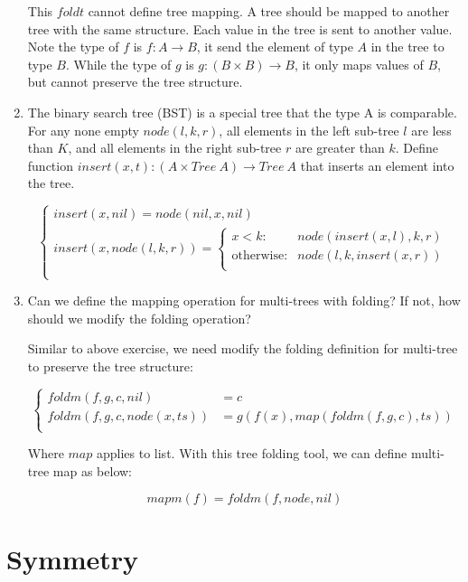 \documentclass[UTF8]{article}
\begin{document}
\begin{enumerate}
This $foldt$ cannot define tree mapping. A tree should be mapped to another tree with the same structure. Each value in the tree is sent to another value. Note the type of $f$ is $f : A \to B$, it send the element of type $A$ in the tree to type $B$. While the type of $g$ is $g : (B \times B) \to B$, it only maps values of $B$, but cannot preserve the tree structure.

\item {The binary search tree (BST) is a special tree that the type A is comparable. For any none empty $node(l, k, r)$, all elements in the left sub-tree $l$ are less than $K$, and all elements in the right sub-tree $r$ are greater than $k$. Define function $insert(x, t) : (A \times Tree\ A) \to Tree\ A$ that inserts an element into the tree.}

\[ \begin{cases}
insert(x, nil) = node(nil, x, nil) \\
insert(x, node(l, k, r)) = \begin{cases}
  x < k: & node(insert(x, l), k, r) \\
  \text{otherwise}: & node(l, k, insert(x, r)) \\
\end{cases} \\
\end{cases}\]

\item {Can we define the mapping operation for multi-trees with folding? If not, how should we modify the folding operation?}

Similar to above exercise, we need modify the folding definition for multi-tree to preserve the tree structure:

\[
\begin{cases}
foldm(f, g, c, nil) & = c \\
foldm(f, g, c, node(x, ts)) & = g(f(x), map(foldm(f, g, c), ts)) \\
\end{cases}
\]

Where $map$ applies to list. With this tree folding tool, we can define multi-tree map as below:

\[
mapm(f) = foldm(f, node, nil)
\]

\end{enumerate}

\section{Symmetry}
\end{document}
